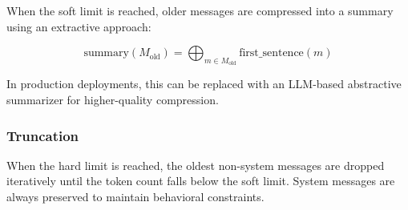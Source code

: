 When the soft limit is reached, older messages are compressed into a summary using an extractive approach:

\begin{equation}
    \text{summary}(M_{\text{old}}) = \bigoplus_{m \in M_{\text{old}}} \text{first\_sentence}(m)
\end{equation}

In production deployments, this can be replaced with an LLM-based abstractive summarizer for higher-quality compression.

\subsubsection{Truncation}

When the hard limit is reached, the oldest non-system messages are dropped iteratively until the token count falls below the soft limit. System messages are always preserved to maintain behavioral constraints.

